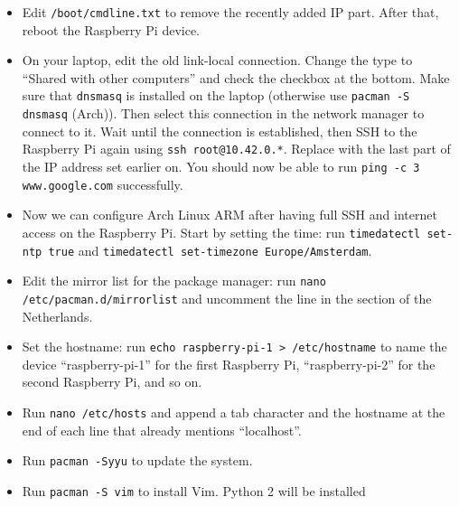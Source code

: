 \documentclass{article}
\newcommand{\arch}{{\color{red} (Arch)}}
\begin{document}
\begin{itemize}
          {\tt interface eth0} \\
          {\tt static ip\_address=10.42.0.10/24} \\
          {\tt static routers=10.42.0.1} \\
          {\tt static domain\_name\_servers=10.42.0.1 8.8.8.8}

          This is for the first Raspberry Pi. For the second device, change
          10.42.0.10 to 10.42.0.11. If after this change you cannot SSH into 
          the device, run {\tt nmap -sP 10.42.0.0/24} on your computer to 
          determine which IP address was assigned to the device.
    \item Edit {\tt /boot/cmdline.txt} to remove the recently added IP part.
          After that, reboot the Raspberry Pi device.
    \item On your laptop, edit the old link-local connection. Change the type 
          to ``Shared with other computers'' and check the checkbox at the 
          bottom. Make sure that {\tt dnsmasq} is installed on the laptop 
          (otherwise use {\tt pacman -S dnsmasq} \arch{}). Then select this 
          connection in the network manager to connect to it. Wait until the 
          connection is established, then SSH to the Raspberry Pi again using 
          {\tt ssh root@10.42.0.*}. Replace {\tt *} with the last part of the 
          IP address set earlier on. You should now be able to run {\tt ping -c 
          3 www.google.com} successfully.
    \item Now we can configure Arch Linux ARM after having full SSH and 
          internet access on the Raspberry Pi. Start by setting the time: run 
          {\tt timedatectl set-ntp true} and {\tt timedatectl set-timezone 
          Europe/Amsterdam}.
    \item Edit the mirror list for the package manager: run {\tt nano 
          /etc/pacman.d/mirrorlist} and uncomment the line in the section of 
          the Netherlands.
    \item Set the hostname: run {\tt echo raspberry-pi-1 > /etc/hostname} to 
          name the device ``raspberry-pi-1'' for the first Raspberry Pi, 
          ``raspberry-pi-2'' for the second Raspberry Pi, and so on.
    \item Run {\tt nano /etc/hosts} and append a tab character and the hostname 
          at the end of each line that already mentions ``localhost''.
    \item Run {\tt pacman -Syyu} to update the system.
    \item Run {\tt pacman -S vim} to install Vim. Python 2 will be installed 

\end{itemize}
\end{document}
